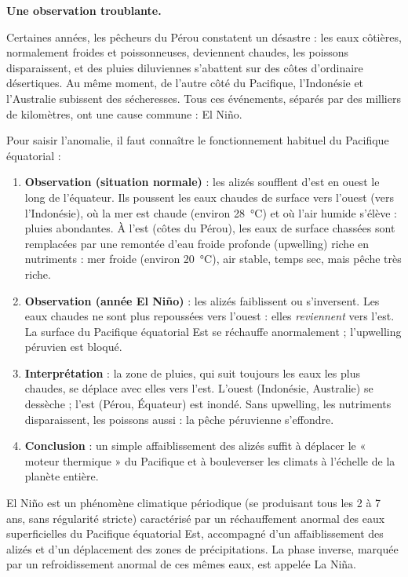 \documentclass[11pt]{article}
\newcommand{\cle}[1]{{\popxbold\color{popdark}#1}}
\newcounter{popsec}
\newcounter{popsub}
\newcommand{\courssub}[1]{%
  \stepcounter{popsub}%
  \par\vspace{9pt}\noindent{\popxbold\fontsize{11.5}{13}\selectfont\color{popink}{\color{poporange}\thepopsec.\thepopsub}\hspace{6pt}#1}\par\nopagebreak\vspace{4pt}
}
\begin{document}
\courssub{El Niño : quand le Pacifique se dérègle}

\textbf{Une observation troublante.}\par
Certaines années, les pêcheurs du Pérou constatent un désastre : les eaux côtières, normalement froides et poissonneuses, deviennent chaudes, les poissons disparaissent, et des pluies diluviennes s'abattent sur des côtes d'ordinaire désertiques. Au même moment, de l'autre côté du Pacifique, l'Indonésie et l'Australie subissent des sécheresses. Tous ces événements, séparés par des milliers de kilomètres, ont une cause commune : \cle{El Niño}.

\begin{methode}
Pour saisir l'anomalie, il faut connaître le fonctionnement habituel du Pacifique équatorial :
\begin{enumerate}
\item \textbf{Observation (situation normale)} : les \cle{alizés} soufflent d'est en ouest le long de l'équateur. Ils poussent les eaux chaudes de surface vers l'ouest (vers l'Indonésie), où la mer est chaude (environ \SI{28}{\celsius}) et où l'air humide s'élève : pluies abondantes. À l'est (côtes du Pérou), les eaux de surface chassées sont remplacées par une remontée d'eau froide profonde (\cle{upwelling}) riche en nutriments : mer froide (environ \SI{20}{\celsius}), air stable, temps sec, mais pêche très riche.
\item \textbf{Observation (année El Niño)} : les alizés faiblissent ou s'inversent. Les eaux chaudes ne sont plus repoussées vers l'ouest : elles \emph{reviennent} vers l'est. La surface du Pacifique équatorial Est se réchauffe anormalement ; l'upwelling péruvien est bloqué.
\item \textbf{Interprétation} : la zone de pluies, qui suit toujours les eaux les plus chaudes, se déplace avec elles vers l'est. L'ouest (Indonésie, Australie) se dessèche ; l'est (Pérou, Équateur) est inondé. Sans upwelling, les nutriments disparaissent, les poissons aussi : la pêche péruvienne s'effondre.
\item \textbf{Conclusion} : un simple affaiblissement des alizés suffit à déplacer le « moteur thermique » du Pacifique et à bouleverser les climats à l'échelle de la planète entière.
\end{enumerate}
\end{methode}

\begin{definition}[El Niño]
\cle{El Niño} est un phénomène climatique \cle{périodique} (se produisant tous les \cle{2 à 7 ans}, sans régularité stricte) caractérisé par un \cle{réchauffement anormal des eaux superficielles du Pacifique équatorial Est}, accompagné d'un affaiblissement des alizés et d'un déplacement des zones de précipitations. La phase inverse, marquée par un refroidissement anormal de ces mêmes eaux, est appelée \cle{La Niña}.
\end{definition}
\end{document}
